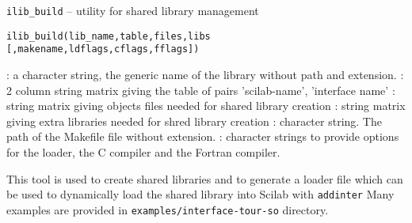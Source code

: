 
\begin{mandesc}
  \texttt{ilib\_build} --  utility for shared library management\\ %
\end{mandesc}
\label{ilib-build}
\begin{calling_sequence}
\begin{verbatim}
ilib_build(lib_name,table,files,libs [,makename,ldflags,cflags,fflags])  
\end{verbatim}
\end{calling_sequence}
\begin{parameters}
  \begin{varlist}
    : a character string, the generic name of the library without path and extension.
    : 2 column string matrix giving the table of pairs 'scilab-name', 'interface name'
    : string matrix giving objects files needed for shared library creation
    : string matrix giving extra libraries needed for shred library creation
    : character string. The path of the Makefile file without extension.
    : character strings to provide options for the loader, the C compiler and the Fortran compiler.
  \end{varlist}
\end{parameters}
\begin{mandescription}
  This tool is used to create shared libraries and to generate a 
  loader file which can be used to dynamically load the shared library 
  into Scilab with \verb!addinter!
  Many examples are provided in \verb!examples/interface-tour-so!
  directory.
\end{mandescription}
